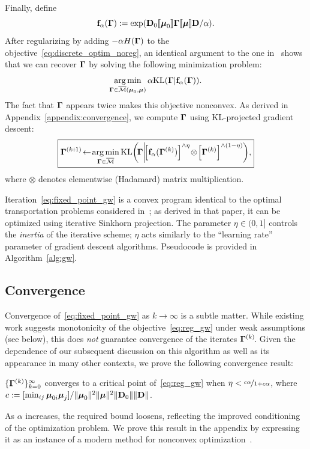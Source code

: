 Finally, define
$$\mathbf{f}_\alpha(\mathbf \Gamma):= \exp(\mathbf D_0[\![\boldsymbol{\mu}_0]\!]\mathbf \Gamma[\![\boldsymbol{\mu}]\!]\mathbf D/\alpha).$$
After regularizing by adding $-\alpha H(\mathbf \Gamma)$ to the objective~\eqref{eq:discrete_optim_noreg}, an identical argument to the one in~\cite{benamou-2015} shows that we can recover $\mathbf \Gamma$ by solving the following minimization problem: %
\begin{equation}\label{eq:reg_gw}
\operatorname*{arg\,min}_{\mathbf \Gamma\in\overline{\mathcal M}(\boldsymbol{\mu}_0,\boldsymbol{\mu})} \alpha\mathrm{KL}(\mathbf \Gamma|\mathbf{f}_\alpha(\mathbf \Gamma)).
\end{equation}
The fact that $\mathbf \Gamma$ appears twice makes this objective nonconvex.  As derived in Appendix~\ref{appendix:convergence}, we compute $\mathbf \Gamma$ using KL-projected gradient descent:%
\begin{equation}\label{eq:fixed_point_gw}
\boxed{\G^{(k\!+\!1)}\!\gets\!\argmin_{\G\in\bM}%
%
\KL\!\left(\!\G\!
\left|\!
\left[\f_\alpha(\G^{(k)})\right]^{\wedge\eta}\!\otimes\!\left[\G^{(k)}\right]^{\wedge(1-\eta)}\right.
\!\right)\!,}
\end{equation}
where $\otimes$ denotes elementwise (Hadamard) matrix multiplication.

Iteration~\eqref{eq:fixed_point_gw} is a convex program identical to the optimal transportation problems considered in~\cite{benamou-2015}; as derived in that paper, it can be optimized using iterative Sinkhorn projection.  The parameter $\eta\in(0,1]$ controls the \emph{inertia} of the iterative scheme; $\eta$ acts similarly to the ``learning rate'' parameter of gradient descent algorithms.  Pseudocode is provided in Algorithm~\ref{alg:gw}.  

\subsection{Convergence}\label{sec:convergence}

Convergence of~\eqref{eq:fixed_point_gw} as $k\rightarrow\infty$ is a subtle matter.  While existing work suggests monotonicity of the objective~\eqref{eq:reg_gw} under weak assumptions (see below), this does \emph{not} guarantee convergence of the iterates $\mathbf \Gamma^{(k)}\!$.  Given the dependence of our subsequent discussion on this algorithm as well as its appearance in many other contexts, we prove the following convergence result:
\begin{proposition}\label{prop:gw_convergence}
$\{\mathbf \Gamma^{(k)}\}_{k=0}^\infty$ converges to a critical point of~\eqref{eq:reg_gw} when $\eta<\nicefrac{c\alpha}{1+c\alpha}$, where $c:=[\min_{ij}\boldsymbol{\mu}_{0i}\boldsymbol{\mu}_j]/\|\boldsymbol{\mu}_0\|^2\|\boldsymbol{\mu}\|^2\|\mathbf D_0\|\|\mathbf D\|$.
\end{proposition}
As $\alpha$ increases, the required bound loosens, reflecting the improved conditioning of the optimization problem.  We prove this result in the appendix by expressing it as an instance of a modern method for nonconvex optimization~\cite{bot-2015}.

